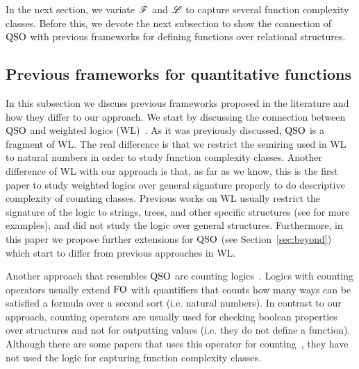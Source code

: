 In the next section, we variate $\mathscr{F}$ and $\mathscr{L}$ to capture several function complexity classes. Before this, we devote the next subsection to show the connection of ${\rm QSO}$ with previous frameworks for defining functions over relational structures.

\subsection{Previous frameworks for quantitative functions} \label{sec:previous}

In this subsection we discuss previous frameworks proposed in the literature and how they differ to our approach.
We start by discussing the connection between ${\rm QSO}$ and weighted logics (WL)~\cite{DrosteG07}. 
As it was previously discussed, ${\rm QSO}$ is a fragment of WL.
The real difference is that we restrict the semiring used in WL to natural numbers in order to study function complexity classes.
Another difference of WL with our approach is that, as far as we know, this is the first paper to study weighted logics over general signature properly to do descriptive complexity of counting classes. 
Previous works on WL usually restrict the signature of the logic to strings, trees, and other specific structures (see \cite{droste2009handbook} for more examples), and did not study the logic over general structures. 
Furthermore, in this paper we propose further extensions for ${\rm QSO}$ (see Section~\ref{sec:beyond}) which start to differ from previous approaches in WL.

Another approach that resembles ${\rm QSO}$ are counting logics~\cite{L04,counting-paper-here}. 
Logics with counting operators usually extend ${\rm FO}$ with quantifiers that counts how many ways can be satisfied a formula over a second sort (i.e. natural numbers). 
In contrast to our approach, counting operators are usually used for checking boolean properties over structures and not for outputting values (i.e. they do not define a function).
Although there are some papers that uses this operator for counting~\cite{XXX}, they have not used the logic for capturing function complexity classes.



